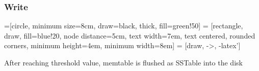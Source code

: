 \documentclass[
	11pt, 
]{beamer}
\begin{document}
\begin{frame}
    \frametitle{Write}

    =[circle, minimum size=8cm, draw=black, thick, fill=green!50]
 = [rectangle, draw, fill=blue!20, node distance=5cm,
    text width=7em, text centered, rounded corners, minimum height=4em, minimum width=8em]
 = [draw, ->, -latex']

    \begin{center}
    \end{center}
    \begin{boxD}
After reaching threshold value, memtable is flushed as SSTable into the disk
\end{boxD}
\end{frame}
\end{document}
